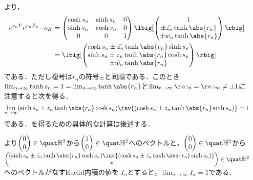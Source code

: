 \begin{npfwn}
  より， 
  \begin{align*}
    e^{s_n Y}e^{r_n Z_n}\cdot o_K &=
    \begin{pmatrix}
      \cosh s_n & \sinh s_n & 0 \\
      \sinh s_n & \cosh s_n & 0 \\
      0 & 0 & 1 
    \end{pmatrix}
              \lbig[\begin{pmatrix}
                1\\ \pm \bar{z_n} \tanh \abs{r_n}  \\ \pm \bar{w_n} \tanh \abs{r_n}
              \end{pmatrix}\rbig]\\
    &=  \lbig[ \begin{pmatrix}
      \cosh s_n \pm \bar{z_n} \tanh \abs{r_n} \sinh s_n \\ \sinh s_n \pm \bar{z_n} \tanh \abs{r_n} \cosh s_n \\ \pm \bar{w_n} \tanh \abs{r_n}
    \end{pmatrix}\rbig]
  \end{align*}
  である．ただし複号は$r_n$の符号$\pm$と同順である．このとき$\lim_{n\to \infty}\tanh s_n = 1 = \lim_{n\to \infty}\tanh \abs{r_n} $と$\lim_{n\to \infty} \re z_n = \re z_{\infty} \neq \pm 1$に注意すると次を得る．
  \begin{align}
    \lim_{n\to \infty}(\sinh s_n \pm \bar{z_n} \tanh \abs{r_n} \cosh s_n)\inv{(\cosh s_n \pm \bar{z_n} \tanh \abs{r_n} \sinh s_n) } = 1\label{eq:-1}
  \end{align}
  である．を得るための具体的な計算は後述する．

  より$
  \begin{pmatrix}
    0 \\ 0 
  \end{pmatrix}
  \in \quat\mathbb{H}^2 $から$
  \begin{pmatrix}
    1 \\ 0 
  \end{pmatrix}
  \in \quat\mathbb{H}^2 $へのベクトルと，$
  \begin{pmatrix}
    0 \\ 0 
  \end{pmatrix}
  \in \quat\mathbb{H}^2 $から\\
  $ \begin{pmatrix}
    (\sinh s_n \pm \bar{z_n} \tanh \abs{r_n} \cosh s_n)\inv{(\cosh s_n \pm \bar{z_n} \tanh \abs{r_n} \sinh s_n) } \\  \ast 
  \end{pmatrix}\in \quat\mathbb{H}^2 $へのベクトルがなすEuclid内積の値を $I_n$とすると，$\lim_{n\to \infty}I_n = 1 $である．


\end{npfwn}
